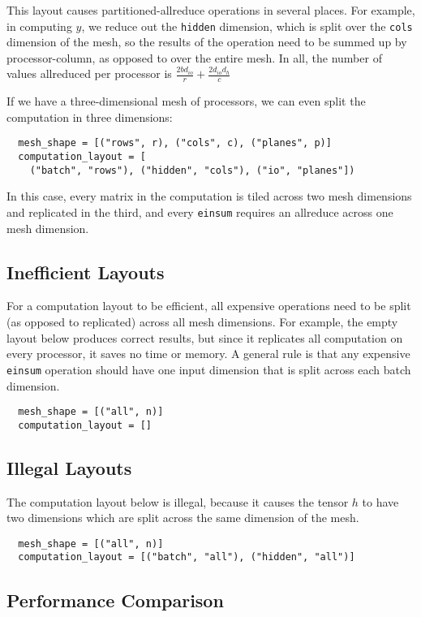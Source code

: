 \documentclass{article}
\begin{document}
This layout causes partitioned-allreduce operations in several places.  For example, in computing $y$, we reduce out the \texttt{hidden} dimension, which is split over the \texttt{cols} dimension of the mesh, so the results of the operation need to be summed up by processor-column, as opposed to over the entire mesh.  In all, the number of values allreduced per processor is $\frac{2bd_{io}}{r} + \frac{2d_{io}d_h}{c}$

If we have a three-dimensional mesh of processors, we can even split the computation in three dimensions:
\begin{verbatim}
  mesh_shape = [("rows", r), ("cols", c), ("planes", p)]
  computation_layout = [
    ("batch", "rows"), ("hidden", "cols"), ("io", "planes"])
\end{verbatim}
In this case, every matrix in the computation is tiled across two mesh dimensions and replicated in the third, and every \texttt{einsum} requires an allreduce across one mesh dimension.

\subsection{Inefficient Layouts}
For a computation layout to be efficient, all expensive operations need to be split (as opposed to replicated) across all mesh dimensions.  For example, the empty layout below produces correct results, but since it replicates all computation on every processor, it saves no time or memory.  A general rule is that any expensive \texttt{einsum} operation should have one input dimension that is split across each batch dimension.
\begin{verbatim}
  mesh_shape = [("all", n)]
  computation_layout = []
\end{verbatim}

\subsection{Illegal Layouts}
The computation layout below is illegal, because it causes the tensor $h$ to have two dimensions which are split across the same dimension of the mesh.
\begin{verbatim}
  mesh_shape = [("all", n)]
  computation_layout = [("batch", "all"), ("hidden", "all")]
\end{verbatim}

\subsection{Performance Comparison}
\end{document}
